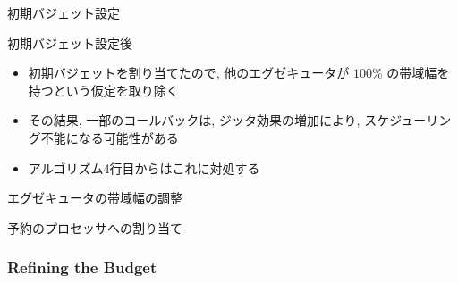 \begin{frame}{初期バジェット設定}
\end{frame}

\begin{frame}{初期バジェット設定後}
    \begin{itemize}
        \item 初期バジェットを割り当てたので, 他のエグゼキュータが $100 \%$ の帯域幅を持つという仮定を取り除く
        \item その結果, 一部のコールバックは, ジッタ効果の増加により, スケジューリング不能になる可能性がある
        \item アルゴリズム4行目からはこれに対処する
    \end{itemize}
\end{frame}

\begin{frame}{エグゼキュータの帯域幅の調整}
\end{frame}

\begin{frame}{予約のプロセッサへの割り当て}
\end{frame}


\subsubsection{Refining the Budget}
\label{sssec: refining the budget}

